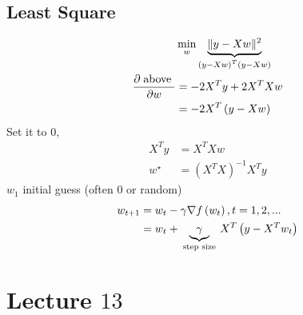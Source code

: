 \documentclass{article}
\begin{document}
\subsection{Least Square}
\begin{align*}
&\displaystyle\min_{w} \underbrace{\| y - X w \|^{2}}_{\left(y - X w\right)^{T} \left(y - X w \right)}
\\ \dfrac{\partial \text{\;above\;}}{\partial w} &= - 2 X^{T} y + 2 X^{T} X w 
\\ &= -2 X^{T} \left(y - X w\right)
\end{align*}
Set it to $0$,
\begin{align*}
X^{T} y &= X^{T} X w 
\\ w^\star  &= \left(X^{T} X\right)^{-1} X^{T} y 
\end{align*}
$w_{1}$ initial guess (often $0$ or random)
\begin{align*}
w_{t+1} &= w_{t} - \gamma \nabla  f\left(w_{t}\right), t = 1, 2, ...
\\ &= w_{t} + \underbrace{\gamma}_{\text{\;step size\;}} X^{T} \left(y - X^{T} w_{t}\right)
\end{align*}





\section{Lecture $13$} 
\end{document}
